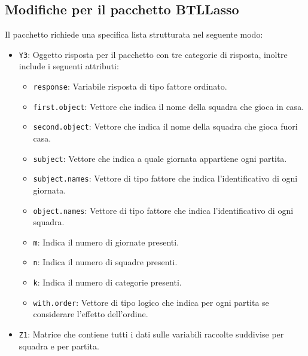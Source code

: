 \begin{comment}
\begin{lstlisting}[language=R, caption={Codice per la creazione del data.frame Vs}, captionpos=b, label=sec:a3]
	> AdjserieA2$Vs <- data.frame(team = AdjserieA2$Vs, GF = GFVs, GA = GAVs, at.home = 0, Poss = PossVs, Sh = ShVs, SoT = ShTVs, G.Sh = G.ShVs, PAtt = PAttVs, PCmp. = PCmp.Vs, SPAtt = SPAttVs, SPCmp. = SPCmp.Vs, MPAtt = MPAttVs, MPCmp. = MPCmp.Vs, LPAtt = LPAttVs, LPCmp. = LPCmp.Vs, ToDef3rd = ToDef3rdVs, ToAtt3rd = ToAtt3rdVs, ToAttPen = ToAttPenVs, TotDist = ToDistVs, Fls = FlsVs, Fld = FldVs, Crs = CrsVs, Int = IntVs, TklWin = TklWinVs, Recov = RecovVs)
\end{lstlisting}
\end{comment}
\subsection{Modifiche per il pacchetto BTLLasso}
Il pacchetto richiede una specifica lista strutturata nel seguente modo:
\begin{itemize}
	\item \texttt{Y3}: Oggetto risposta per il pacchetto con tre categorie di risposta, inoltre include i seguenti attributi: 
	\begin{itemize}
		\item \texttt{response}: Variabile risposta di tipo fattore ordinato.
		\item \texttt{first.object}: Vettore che indica il nome della squadra che gioca in casa.
		\item \texttt{second.object}: Vettore che indica il nome della squadra che gioca fuori casa.
		\item \texttt{subject}: Vettore che indica a quale giornata appartiene ogni partita.
		\item \texttt{subject.names}: Vettore di tipo fattore che indica l'identificativo di ogni giornata.
		\item \texttt{object.names}: Vettore di tipo fattore che indica l'identificativo di ogni squadra.
		\item \texttt{m}: Indica il numero di giornate presenti.
		\item \texttt{n}: Indica il numero di squadre presenti.
		\item \texttt{k}: Indica il numero di categorie presenti.
		\item \texttt{with.order}: Vettore di tipo logico che indica per ogni partita se considerare l'effetto dell'ordine.				
	\end{itemize}
	\item \texttt{Z1}: Matrice che contiene tutti i dati sulle variabili raccolte suddivise per squadra e per partita.
\end{itemize} 
